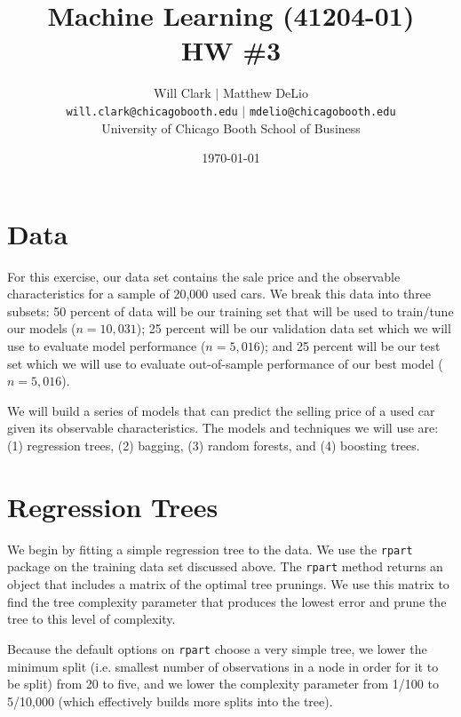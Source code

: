 \documentclass[11pt, fleqn]{article}
\begin{document}
\title{Machine Learning (41204-01)\\HW \#3}
\author{Will Clark $\vert$ Matthew DeLio \\
\texttt{will.clark@chicagobooth.edu} $\vert$ \texttt{mdelio@chicagobooth.edu} \\
University of Chicago Booth School of Business}
\date{\today}
\maketitle

\section{Data}

For this exercise, our data set contains the sale price and the observable characteristics for a sample of 20,000 used cars. We break this data into three subsets: 50 percent of data will be our training set that will be used to train/tune our models ($n=10,031$); 25 percent will be our validation data set which we will use to evaluate model performance ($n=5,016$); and 25 percent will be our test set which we will use to evaluate out-of-sample performance of our best model ($n=5,016$).

We will build a series of models that can predict the selling price of a used car given its observable characteristics. The models and techniques we will use are: (1) regression trees, (2) bagging, (3) random forests, and (4) boosting trees.

\section{Regression Trees}

We begin by fitting a simple regression tree to the data. We use the \texttt{rpart} package on the training data set discussed above. The \texttt{rpart} method returns an object that includes a matrix of the optimal tree prunings. We use this matrix to find the tree complexity parameter that produces the lowest error and prune the tree to this level of complexity.

Because the default options on \texttt{rpart} choose a very simple tree, we lower the minimum split (i.e. smallest number of observations in a node in order for it to be split) from 20 to five, and we lower the complexity parameter from 1/100 to 5/10,000 (which effectively builds more splits into the tree).
\end{document}
